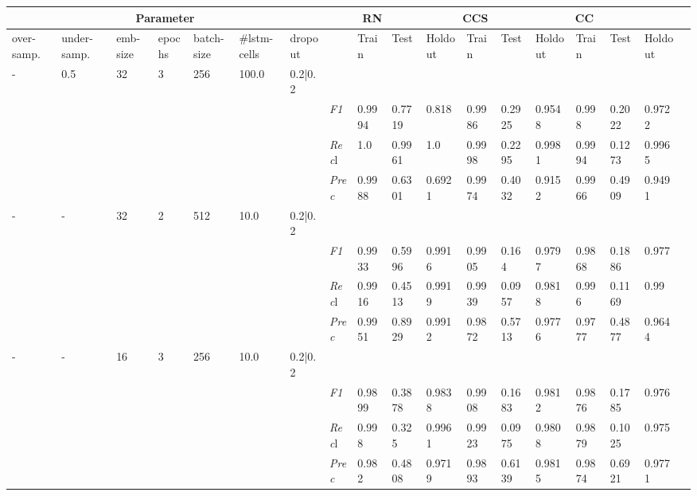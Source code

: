     \begin{table}[]
    \tiny
    \tabcolsep=0.11cm
    \begin{tabularx}{\textwidth}{XXXXXXX|X|XXX|XXX|XXXX}
    \toprule
    \multicolumn{7}{c}{Parameter} & \multicolumn{3}{c}{RN} & \multicolumn{3}{c}{CCS} & \multicolumn{3}{c}{CC} \\ \midrule
    over-\newline samp. & under-\newline samp. & emb-\newline size & epochs &batch-\newline size & \#lstm-\newline cells & dropout & & Train &  Test & Holdout & Train &  Test & Holdout & Train &  Test & Holdout \\ \midrule
    - & 0.5 & 32 & 3 & 256 &100.0 & 0.2|0.2 & & & & & & & & & \\
    & & & & & & & \textit{F1} & 0.9994 & 0.7719 & 0.818 & 0.9986 & 0.2925        & 0.9548        & 0.998        & 0.2022        & 0.9722        \\
    & & & & & & & \textit{Rec}l & 1.0 & 0.9961 & 1.0    & 0.9998 & 0.2295    & 0.9981    & 0.9994    & 0.1273    & 0.9965    \\
    & & & & & & & \textit{Prec} & 0.9988 & 0.6301 & 0.6921 & 0.9974 & 0.4032 & 0.9152 & 0.9966 & 0.4909 & 0.9491 \\ \midrule
    - & - & 32 & 2 & 512 &10.0 & 0.2|0.2 & & & & & & & & & \\
    & & & & & & & \textit{F1} & 0.9933 & 0.5996 & 0.9916 & 0.9905 & 0.164        & 0.9797        & 0.9868        & 0.1886        & 0.977        \\
    & & & & & & & \textit{Rec}l & 0.9916 & 0.4513 & 0.9919    & 0.9939 & 0.0957    & 0.9818    & 0.996    & 0.1169    & 0.99    \\
    & & & & & & & \textit{Prec} & 0.9951 & 0.8929 & 0.9912 & 0.9872 & 0.5713 & 0.9776 & 0.9777 & 0.4877 & 0.9644 \\ \midrule
    - & - & 16 & 3 & 256 &10.0 & 0.2|0.2 & & & & & & & & & \\
    & & & & & & & \textit{F1} & 0.9899 & 0.3878 & 0.9838 & 0.9908 & 0.1683        & 0.9812        & 0.9876        & 0.1785        & 0.976        \\
    & & & & & & & \textit{Rec}l & 0.998 & 0.325 & 0.9961    & 0.9923 & 0.0975    & 0.9808    & 0.9879    & 0.1025    & 0.975    \\
    & & & & & & & \textit{Prec} & 0.982 & 0.4808 & 0.9719 & 0.9893 & 0.6139 & 0.9815 & 0.9874 & 0.6921 & 0.9771 \\ \midrule

\end{tabularx}
\end{table}

